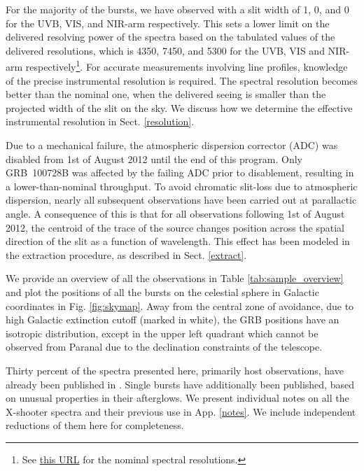 \documentclass[longauth]{aa}    %
\begin{document}
For the majority of the bursts, we have observed with a slit width of 1,
0, and 0 for the UVB, VIS, and NIR-arm respectively. This sets a
lower limit on the delivered resolving power of the spectra based on the
tabulated values of the delivered resolutions, which is 4350, 7450, and 5300 for
the UVB, VIS and NIR-arm respectively\footnote{See
	\href{https://www.eso.org/sci/facilities/paranal/instruments/xshooter/inst.html}{this URL} for the nominal spectral resolutions.}. 
For accurate measurements involving line profiles, knowledge of the precise
instrumental resolution is required. The spectral resolution becomes better than
the nominal one, when the delivered seeing is smaller than the projected width
of the slit on the sky. We discuss how we determine the effective instrumental
resolution in Sect. \ref{resolution}.

Due to a mechanical failure, the atmospheric dispersion corrector (ADC) was
disabled from 1st of August 2012 until the end of this program. Only GRB~100728B
was affected by the failing ADC prior to disablement, resulting in a
lower-than-nominal throughput. To avoid chromatic slit-loss due to atmospheric
dispersion, nearly all subsequent observations have been carried out at
parallactic angle. A consequence of this is that for all observations following
1st of August 2012, the centroid of the trace of the source changes position
across the spatial direction of the slit as a function of wavelength. This
effect has been modeled in the extraction procedure, as described in Sect.
\ref{extract}.



We provide an overview of all the observations in Table
\ref{tab:sample_overview} and plot the positions of all the bursts on the
celestial sphere in Galactic coordinates in Fig. \ref{fig:skymap}. Away from the
central zone of avoidance, due to high Galactic extinction cutoff (marked in
white), the GRB positions have an isotropic distribution, except in the upper
left quadrant which cannot be observed from Paranal due to the declination
constraints of the telescope.

Thirty percent of the spectra presented here, primarily host observations, have
already been published in \citet{Kruhler2015}. Single bursts have additionally
been published, based on unusual properties in their afterglows. We present
individual notes on all the X-shooter spectra and their previous use in App.
\ref{notes}. We include independent reductions of them here for completeness.
\end{document}
